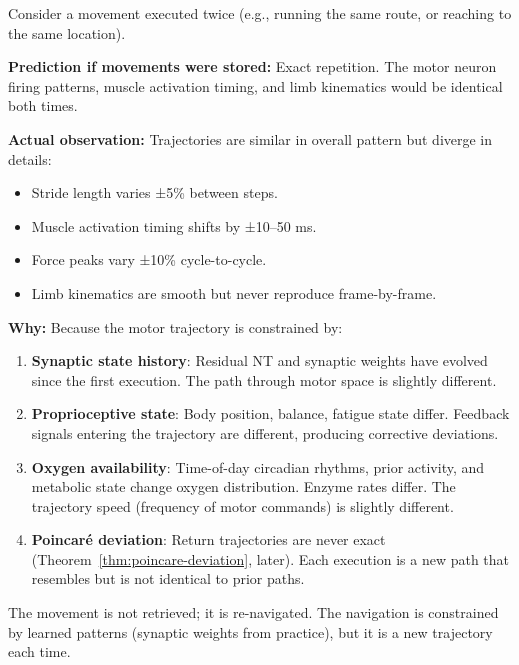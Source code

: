 \begin{theorem}
\label{thm:movement-paths}
Consider a movement executed twice (e.g., running the same route, or reaching to the same location).

\textbf{Prediction if movements were stored:}
Exact repetition. The motor neuron firing patterns, muscle activation timing, and limb kinematics would be identical both times.

\textbf{Actual observation:}
Trajectories are similar in overall pattern but diverge in details:
\begin{itemize}[noitemsep]
\item Stride length varies ±5\% between steps.
\item Muscle activation timing shifts by ±10--50 ms.
\item Force peaks vary ±10\% cycle-to-cycle.
\item Limb kinematics are smooth but never reproduce frame-by-frame.
\end{itemize}

\textbf{Why:} Because the motor trajectory is constrained by:
\begin{enumerate}[label=(\roman*), noitemsep]
\item \textbf{Synaptic state history}: Residual NT and synaptic weights have evolved since the first execution. The path through motor space is slightly different.
\item \textbf{Proprioceptive state}: Body position, balance, fatigue state differ. Feedback signals entering the trajectory are different, producing corrective deviations.
\item \textbf{Oxygen availability}: Time-of-day circadian rhythms, prior activity, and metabolic state change oxygen distribution. Enzyme rates differ. The trajectory speed (frequency of motor commands) is slightly different.
\item \textbf{Poincaré deviation}: Return trajectories are never exact (Theorem~\ref{thm:poincare-deviation}, later). Each execution is a new path that resembles but is not identical to prior paths.
\end{enumerate}

The movement is not retrieved; it is re-navigated. The navigation is constrained by learned patterns (synaptic weights from practice), but it is a new trajectory each time.
\end{theorem}

